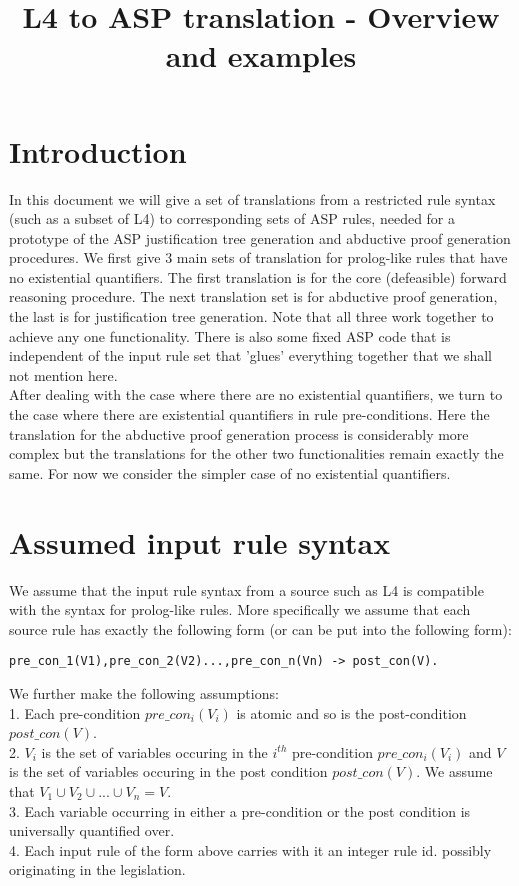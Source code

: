 \documentclass{article}
\title{L4 to ASP translation - Overview and examples}
\author{}
\begin{document}
\maketitle


\section{Introduction}

In this document we will give a set of translations from a restricted rule syntax (such as a subset of L4) to corresponding sets of ASP rules, needed for a  prototype of the ASP justification tree generation and abductive proof generation procedures. We first give 3 main sets of translation for prolog-like rules that have no existential quantifiers. The first translation is for the core (defeasible) forward reasoning procedure. The next translation set is for abductive proof generation, the last is for justification tree generation. Note that all three work together to achieve any one functionality. There is also some fixed ASP code that is independent of the input rule set that 'glues' everything together that we shall not mention here.\\
\newline
After dealing with the case where there are no existential quantifiers, we turn to the case where there are existential quantifiers in rule pre-conditions. Here the translation for the abductive proof generation process is considerably more complex but the translations for the other two functionalities remain exactly the same. For now we consider the simpler case of no existential quantifiers.
\section{Assumed input rule syntax}
We assume that the input rule syntax from a source such as L4 is compatible with the syntax for prolog-like rules. More specifically we assume that each source rule has exactly the following form (or can be put into the following form):
\begin{verbatim}
pre_con_1(V1),pre_con_2(V2)...,pre_con_n(Vn) -> post_con(V).
\end{verbatim}
We further make the following assumptions:\\
1. Each pre-condition $pre\_con_{i}(V_{i})$ is atomic and so is the post-condition $post\_con(V)$.\\
2. $V_{i}$ is the set of variables occuring in the $i^{th}$ pre-condition $pre\_con_{i}(V_{i})$ and $V$ is the set of variables occuring in the post condition $post\_con(V)$. We assume that $V_{1}\cup V_{2}\cup ... \cup V_{n} = V$.\\
3. Each variable occurring in either a pre-condition or the post condition is universally quantified over.\\
4. Each input rule of the form above carries with it an integer rule id. possibly originating in the legislation.
\end{document}
